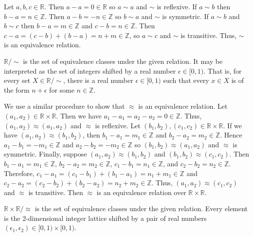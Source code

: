 \documentclass[../../master.tex]{subfiles}
\begin{document}
  \begin{solution}
    Let \(a, b, c \in \mathbb{R}\). Then \(a - a = 0 \in \mathbb{R}\) so \(a \sim a\) and \(\sim\) is reflexive.
    If \(a \sim b\) then \(b - a = n \in \mathbb{Z}\). Then \(a - b = -n \in \mathbb{Z}\) so \(b \sim a\) and \(\sim\) is symmetric.
    If \(a \sim b\) and \(b \sim c\) then \(b - a = m \in \mathbb{Z}\) and \(c - b = n \in \mathbb{Z}\). Then \(c - a = (c - b) + (b - a) = n + m \in \mathbb{Z}\), so \(a \sim c\) and \(\sim\) is transitive.
    Thus, \(\sim\) is an equivalence relation.

    \(\mathbb{R} / {\sim}\) is the set of equivalence classes under the given relation. It may be interpreted as the set of integers shifted by a real number \(\epsilon \in [0, 1)\).
    That is, for every set \(X \in \mathbb{R} / {\sim}\), there is a real number \(\epsilon \in [0, 1)\) such that every \(x \in X\) is of the form \(n + \epsilon\) for some \(n \in \mathbb{Z}\).

    We use a similar procedure to show that \(\approx\) is an equivalence relation. Let \((a_{1}, a_{2}) \in \mathbb{R} \times \mathbb{R}\).
    Then we have \(a_{1} - a_{1} = a_{2} - a_{2} = 0 \in \mathbb{Z}\). Thus, \((a_{1}, a_{2}) \approx (a_{1}, a_{2})\) and \(\approx\) is reflexive.
    Let \((b_{1}, b_{2}), (c_{1}, c_{2}) \in \mathbb{R} \times \mathbb{R}\). If we have \((a_{1}, a_{2}) \approx (b_{1}, b_{2})\), then \(b_{1} - a_{1} = m_{1} \in \mathbb{Z}\) and \(b_{2} - a_{2} = m_{2} \in \mathbb{Z}\).
    Hence \(a_{1} - b_{1} = -m_{1} \in \mathbb{Z}\) and \(a_{2} - b_{2} = -m_{2} \in \mathbb{Z}\) so \((b_{1}, b_{2}) \approx (a_{1}, a_{2})\) and \(\approx\) is symmetric.
    Finally, suppose \((a_{1}, a_{2}) \approx (b_{1}, b_{2})\) and \((b_{1}, b_{2}) \approx (c_{1}, c_{2})\).
    Then \(b_{1} - a_{1} = m_{1} \in \mathbb{Z}\), \(b_{2} - a_{2} = m_{2} \in \mathbb{Z}\), \(c_{1} - b_{1} = n_{1} \in \mathbb{Z}\), and \(c_{2} - b_{2} = n_{2} \in \mathbb{Z}\).
    Therefore, \(c_{1} - a_{1} = (c_{1} - b_{1}) + (b_{1} - a_{1}) = n_{1} + m_{1} \in \mathbb{Z}\) and \(c_{2} - a_{2} = (c_{2} - b_{2}) + (b_{2} - a_{2}) = n_{2} + m_{2} \in \mathbb{Z}\).
    Thus, \((a_{1}, a_{2}) \approx (c_{1}, c_{2})\) and \(\approx\) is transitive. Then \(\approx\) is an equivalence relation over \(\mathbb{R} \times \mathbb{R}\).

    \(\mathbb{R} \times \mathbb{R} / {\approx}\) is the set of equivalence classes under the given relation.
    Every element is the 2-dimensional integer lattice shifted by a pair of real numbers \((\epsilon_{1}, \epsilon_{2}) \in [0, 1) \times [0, 1)\).
  \end{solution}
\end{document}
